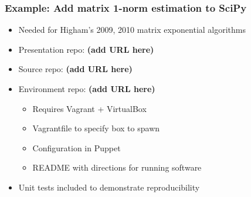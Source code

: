 \documentclass [14pt]{beamer}
\begin{document}
\begin{frame}
\frametitle{Example: Add matrix 1-norm estimation to SciPy}
\begin{itemize}
\item Needed for Higham's 2009, 2010 matrix exponential algorithms
\item Presentation repo: \textbf{(add URL here)}
\item Source repo: \textbf{(add URL here)}
\item Environment repo: \textbf{(add URL here)}
\begin{itemize}
\item Requires Vagrant + VirtualBox
\item Vagrantfile to specify box to spawn
\item Configuration in Puppet
\item README with directions for running software
\end{itemize}
\item Unit tests included to demonstrate reproducibility
\end{itemize}
\end{frame}


\end{document}
